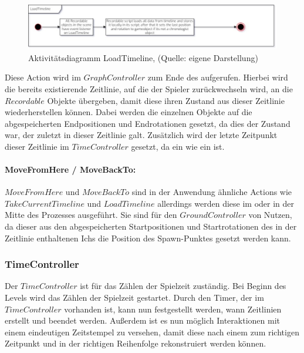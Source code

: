 \begin{figure}[ht]
\centering
\includegraphics[width=1\linewidth]{content/pictures/LoadTimeline_uml.jpg}
\caption{Aktivitätsdiagramm LoadTimeline, (Quelle: eigene Darstellung)}
\label{fig:load_timeline-cs}
\end{figure}

Diese Action wird im $GraphController$ zum Ende des  aufgerufen. Hierbei wird die bereits existierende Zeitlinie, auf die der Spieler zurückwechseln wird, an die $Recordable$ Objekte übergeben, damit diese ihren Zustand aus dieser Zeitlinie wiederherstellen können. Dabei werden die einzelnen Objekte auf die abgespeicherten Endpositionen und Endrotationen gesetzt, da dies der Zustand war, der zuletzt in dieser Zeitlinie galt. 
Zusätzlich wird der letzte Zeitpunkt dieser Zeitlinie im $TimeController$ gesetzt, da ein  wie ein  ist.

\paragraph{MoveFromHere / MoveBackTo:}
$MoveFromHere$ und $MoveBackTo$ sind in der Anwendung ähnliche Actions wie $TakeCurrentTimeline$ und $LoadTimeline$ allerdings werden diese im  oder  in der Mitte des Prozesses ausgeführt. Sie sind für den $GroundController$ von Nutzen, da dieser aus den abgespeicherten Startpositionen und Startrotationen des in der Zeitlinie enthaltenen Ichs die Position des Spawn-Punktes gesetzt werden kann.

\subsubsection{TimeController}
Der $TimeController$ ist für das Zählen der Spielzeit zuständig. Bei Beginn des Levels wird das Zählen der Spielzeit gestartet. Durch den Timer, der im $TimeController$ vorhanden ist, kann nun festgestellt werden, wann Zeitlinien erstellt und beendet werden. Außerdem ist es nun möglich Interaktionen mit einem eindeutigen Zeitstempel zu versehen, damit diese nach einem  zum richtigen Zeitpunkt und in der richtigen Reihenfolge rekonstruiert werden können. 

